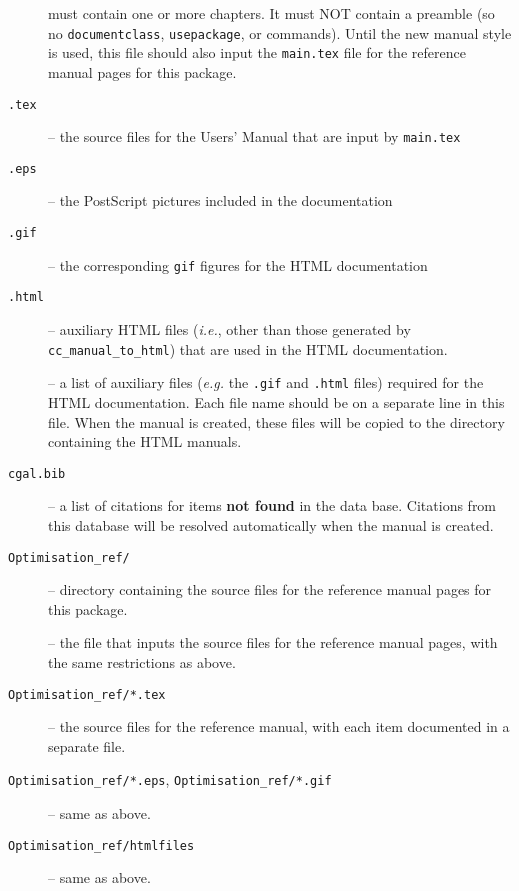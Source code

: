 \begin{description}
 \item[]%
      must contain one or more chapters. It must NOT 
      contain a preamble (so no {\tt documentclass}, {\tt usepackage}, 
      \verb|| or \verb|| commands). 
      Until the new manual style is used, this file should also input the
      {\tt main.tex} file for the reference manual pages for this package.
 \item[{\tt *.tex}] -- the source files for the Users' Manual that are input
      by {\tt main.tex} 
 \item[{\tt *.eps}] -- the PostScript pictures included in the documentation
 \item[{\tt *.gif}] -- the corresponding {\tt gif} figures for the HTML 
      documentation
 \item[{\tt *.html}] -- auxiliary HTML files ({\em i.e.}, other than those
      generated by {\tt cc\_manual\_to\_html}) that are used in the HTML 
      documentation.
 \item[]%
      -- a list of auxiliary files ({\em e.g.} the {\tt .gif} and {\tt .html}
      files) required for the HTML documentation.  Each file name should be
      on a separate line in this file.  When the manual is created, these 
      files will be copied to the directory containing the HTML manuals.
 \item[{\tt cgal.bib}] -- a list of citations
      for items {\bf not found} in the 
      data base.  Citations from this database will be
      resolved automatically when the manual is created. 
 \item[{\tt Optimisation\_ref/}] -- directory containing the source files
      for the reference manual pages for this package. 
 \item[]
       -- the file that inputs the source files for the reference manual pages,
      with the same restrictions as above. 
 \item[{\tt Optimisation\_ref/*.tex}] -- the source files for the reference
      manual, with each item documented in a separate file.
 \item[{\tt Optimisation\_ref/*.eps}, {\tt Optimisation\_ref/*.gif}] -- 
      same as above.
 \item[{\tt Optimisation\_ref/htmlfiles}] -- same as above.
\end{description}

